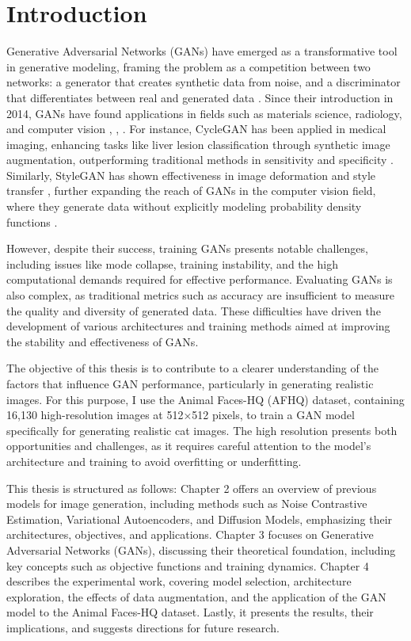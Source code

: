 \chapter{Introduction}


Generative Adversarial Networks (GANs) have emerged as a transformative tool in generative modeling, framing the problem as a competition between two networks: a generator that creates synthetic data from noise, and a discriminator that differentiates between real and generated data \citep{10.48550/arxiv.1704.00028}. Since their introduction in 2014, GANs have found applications in fields such as materials science, radiology, and computer vision \citep{10.1002/mgea.30}, \citep{10.1016/j.media.2019.101552}, \citep{10.1016/j.artmed.2020.101938}. For instance, CycleGAN has been applied in medical imaging, enhancing tasks like liver lesion classification through synthetic image augmentation, outperforming traditional methods in sensitivity and specificity \citep{10.1016/j.neucom.2018.09.013}. Similarly, StyleGAN has shown effectiveness in image deformation and style transfer \citep{10.1109/iccv.2019.00453}, further expanding the reach of GANs in the computer vision field, where they generate data without explicitly modeling probability density functions \citep{10.1016/j.media.2019.101552}.

However, despite their success, training GANs presents notable challenges, including issues like mode collapse, training instability, and the high computational demands required for effective performance. Evaluating GANs is also complex, as traditional metrics such as accuracy are insufficient to measure the quality and diversity of generated data. These difficulties have driven the development of various architectures and training methods aimed at improving the stability and effectiveness of GANs.

The objective of this thesis is to contribute to a clearer understanding of the factors that influence GAN performance, particularly in generating realistic images. For this purpose, I use the Animal Faces-HQ (AFHQ) dataset, containing 16,130 high-resolution images at 512×512 pixels, to train a GAN model specifically for generating realistic cat images. The high resolution presents both opportunities and challenges, as it requires careful attention to the model’s architecture and training to avoid overfitting or underfitting.

This thesis is structured as follows: Chapter 2 offers an overview of previous models for image generation, including methods such as Noise Contrastive Estimation, Variational Autoencoders, and Diffusion Models, emphasizing their architectures, objectives, and applications. Chapter 3 focuses on Generative Adversarial Networks (GANs), discussing their theoretical foundation, including key concepts such as objective functions and training dynamics. Chapter 4 describes the experimental work, covering model selection, architecture exploration, the effects of data augmentation, and the application of the GAN model to the Animal Faces-HQ dataset. Lastly, it presents the results, their implications, and suggests directions for future research.